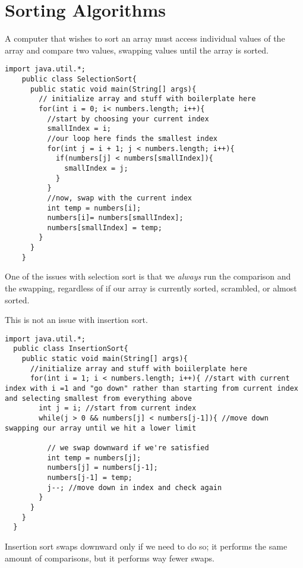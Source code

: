 \documentclass[10pt]{mypackage}
\begin{document}
  \section{Sorting Algorithms}%
  A computer that wishes to sort an array must access individual values of the array and compare two values, swapping values until the array is sorted.
  \begin{lstlisting}[style=javastyle,title=Selection Sort]
    import java.util.*;
    public class SelectionSort{
      public static void main(String[] args){
        // initialize array and stuff with boilerplate here
        for(int i = 0; i< numbers.length; i++){
          //start by choosing your current index
          smallIndex = i;
          //our loop here finds the smallest index
          for(int j = i + 1; j < numbers.length; i++){
            if(numbers[j] < numbers[smallIndex]){
              smallIndex = j;
            }
          }
          //now, swap with the current index
          int temp = numbers[i];
          numbers[i]= numbers[smallIndex];
          numbers[smallIndex] = temp;
        }
      }
    }
  \end{lstlisting}
  One of the issues with selection sort is that we \textit{always} run the comparison and the swapping, regardless of if our array is currently sorted, scrambled, or almost sorted.\newline

  This is not an issue with insertion sort.
  \begin{lstlisting}[style=javastyle,title=Insertion Sort]
  import java.util.*;
  public class InsertionSort{
    public static void main(String[] args){
      //initialize array and stuff with boiilerplate here
      for(int i = 1; i < numbers.length; i++){ //start with current index with i =1 and "go down" rather than starting from current index and selecting smallest from everything above
        int j = i; //start from current index
        while(j > 0 && numbers[j] < numbers[j-1]){ //move down swapping our array until we hit a lower limit

          // we swap downward if we're satisfied
          int temp = numbers[j];
          numbers[j] = numbers[j-1];
          numbers[j-1] = temp;
          j--; //move down in index and check again
        }
      }
    }
  }
  \end{lstlisting}
  Insertion sort swaps downward only if we need to do so; it performs the same amount of comparisons, but it performs way fewer swaps.\newline
\end{document}
